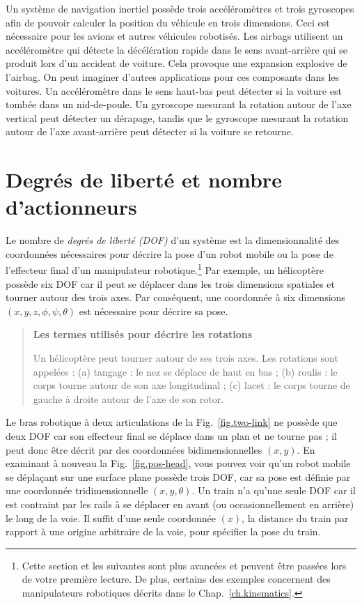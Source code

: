 Un système de navigation inertiel possède trois accéléromètres et trois gyroscopes afin de pouvoir calculer la position du véhicule en trois dimensions. Ceci est nécessaire pour les avions et autres véhicules robotisés. Les airbags utilisent un accéléromètre qui détecte la décélération rapide dans le sens avant-arrière qui se produit lors d'un accident de voiture. Cela provoque une expansion explosive de l'airbag. On peut imaginer d'autres applications pour ces composants dans les voitures. Un accéléromètre dans le sens haut-bas peut détecter si la voiture est tombée dans un nid-de-poule. Un gyroscope mesurant la rotation autour de l'axe vertical peut détecter un dérapage, tandis que le gyroscope mesurant la rotation autour de l'axe avant-arrière peut détecter si la voiture se retourne.


\section{Degrés de liberté et nombre d'actionneurs}\label{s.dof}

Le nombre de \emph{degrés de liberté (DOF)} d'un système est la dimensionnalité des coordonnées nécessaires pour décrire la pose d'un robot mobile ou la pose de l'effecteur final d'un manipulateur robotique.\footnote{Cette section et les suivantes sont plus avancées et peuvent être passées lors de votre première lecture. De plus, certains des exemples concernent des manipulateurs robotiques décrits dans le Chap.~\ref{ch.kinematics}.} Par exemple, un hélicoptère possède six DOF car il peut se déplacer dans les trois dimensions spatiales et tourner autour des trois axes. Par conséquent, une coordonnée à six dimensions $(x,y,z,\phi,\psi,\theta)$ est nécessaire pour décrire sa pose.

\begin{quote}
\begin{center}
\textbf{Les termes utilisés pour décrire les rotations}
\end{center}
Un hélicoptère peut tourner autour de ses trois axes. Les rotations sont appelées : (a) tangage : le nez se déplace de haut en bas ; (b) roulis : le corps tourne autour de son axe longitudinal ; (c) lacet : le corps tourne de gauche à droite autour de l'axe de son rotor.
\end{quote}

Le bras robotique à deux articulations de la Fig.~\ref{fig.two-link} ne possède que deux DOF car son effecteur final se déplace dans un plan et ne tourne pas ; il peut donc être décrit par des coordonnées bidimensionnelles $(x,y)$. En examinant à nouveau la Fig.~\ref{fig.pos-head}, vous pouvez voir qu'un robot mobile se déplaçant sur une surface plane possède trois DOF, car sa pose est définie par une coordonnée tridimensionnelle $(x,y,\theta)$. Un train n'a qu'une seule DOF car il est contraint par les rails à se déplacer en avant (ou occasionnellement en arrière) le long de la voie. Il suffit d'une seule coordonnée $(x)$, la distance du train par rapport à une origine arbitraire de la voie, pour spécifier la pose du train.


